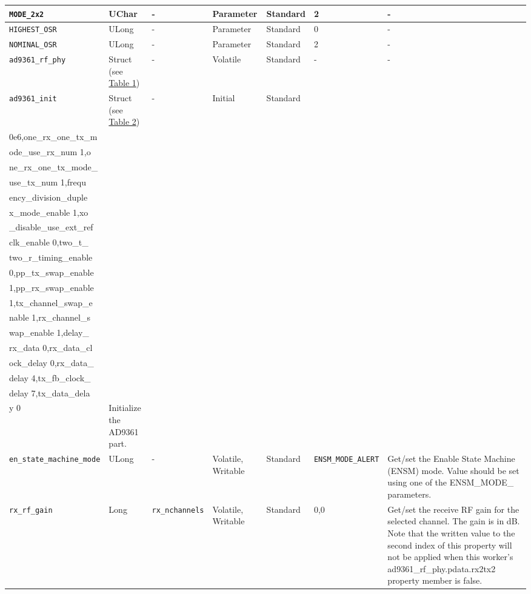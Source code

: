 \documentclass{article}
\begin{document}
\begin{landscape}
\begin{scriptsize}
\begin{longtable}{|p{3.6cm}|p{8.1cm}|p{1.4cm}|p{1.3cm}|p{1.4cm}|p{2.5cm}|p{3.6cm}|}
			\hline
      \verb+MODE_2x2+                  & UChar        & -               & Parameter             & Standard                         & 2                   & - \\
			\hline
      \verb+HIGHEST_OSR+               & ULong        & -               & Parameter             & Standard                         & 0                   & - \\
			\hline
      \verb+NOMINAL_OSR+               & ULong        & -               & Parameter             & Standard                         & 2                   & - \\
			\hline
			\verb+ad9361_rf_phy+ & Struct (see \hyperlink{tab1}{Table 1})  & - & Volatile & Standard & - & - \\
			\hline
			\verb+ad9361_init+ & Struct (see \hyperlink{tab2}{Table 2}) & - & Initial & Standard & \begin{tabular}{l}reference\_clk\_rate 4\\0e6,one\_rx\_one\_tx\_m\\ode\_use\_rx\_num 1,o\\ne\_rx\_one\_tx\_mode\_\\use\_tx\_num 1,frequ\\ency\_division\_duple\\x\_mode\_enable 1,xo\\\_disable\_use\_ext\_ref\\clk\_enable 0,two\_t\_\\two\_r\_timing\_enable\\ 0,pp\_tx\_swap\_enable\\ 1,pp\_rx\_swap\_enable\\ 1,tx\_channel\_swap\_e\\nable 1,rx\_channel\_s\\wap\_enable 1,delay\_\\rx\_data 0,rx\_data\_cl\\ock\_delay 0,rx\_data\_\\delay 4,tx\_fb\_clock\_\\delay 7,tx\_data\_dela\\y 0\end{tabular} & Initialize the AD9361 part. \\
			\hline   
			\verb+en_state_machine_mode+ & ULong & - & Volatile, Writable & Standard & \verb+ENSM_MODE_ALERT+ & Get/set the Enable State Machine (ENSM) mode. Value should be set using one of the ENSM\_MODE\_ parameters.\\
			\hline
			\verb+rx_rf_gain+ & Long & \verb+rx_nchannels+ & Volatile, Writable & Standard & 0,0 & Get/set the receive RF gain for the selected channel. The gain is in dB. Note that the written value to the second index of this property will not be applied when this worker's ad9361\_rf\_phy.pdata.rx2tx2 property member is false.\\

\end{longtable}
\end{scriptsize}
\end{landscape}
\end{document}
